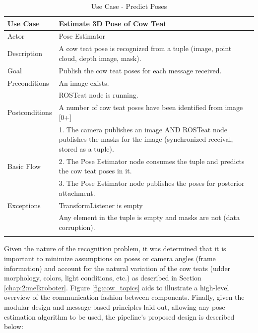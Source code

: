 \begin{longtable}{@{} p{3.5cm} p{10.5cm} @{}} \toprule
\textbf{Use Case}       & \textbf{Estimate 3D Pose of Cow Teat} \\ \midrule
Actor                   & Pose Estimator \\ \cmidrule{1-2}
Description             & A cow teat pose is recognized from a tuple (image, point cloud, depth image, mask). \\ \cmidrule{1-2}
Goal                    & Publish the cow teat poses for each message received. \\ \cmidrule{1-2}
Preconditions           & An image exists. \\ 
                        & ROSTeat node is running. \\ \cmidrule{1-2} 
Postconditions          & A number of cow teat poses have been identified from image [0+]\\ \cmidrule{1-2} 
                        & 1. The camera publishes an image AND ROSTeat node publishes the masks for the image (synchronized receival, stored as a tuple). \\ 
Basic Flow              & 2. The Pose Estimator node consumes the tuple and predicts the cow teat poses in it. \\
                        & 3. The Pose Estimator node publishes the poses for posterior attachment. \\ \cmidrule{1-2}
Exceptions             & TransformListener is empty \\ 
                       & Any element in the tuple is empty and masks are not (data corruption). \\ \bottomrule
\caption{Use Case - Predict Poses} \label{tab:use-pose} \\
\end{longtable}
Given the nature of the recognition problem, it was determined that it is important to minimize assumptions on poses or camera angles (frame information) and account for the natural variation of the cow teats (udder morphology, colors, light conditions, etc.) as described in Section \ref{chap:2:melkroboter}.
Figure \ref{fig:cow_topics} aids to illustrate a high-level overview of the communication fashion between components.
Finally, given the modular design and message-based principles laid out, allowing any pose estimation algorithm to be used, the pipeline's proposed design is described below:

